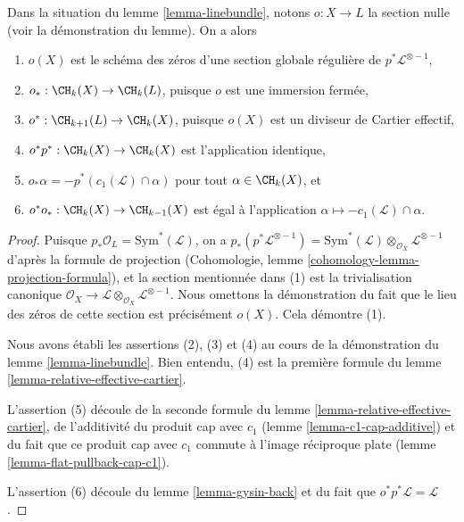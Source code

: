 \begin{lemma}
\label{lemma-linebundle-formulae}
Dans la situation du lemme \ref{lemma-linebundle}, notons $o : X \to L$
la section nulle (voir la démonstration du lemme). On a alors
\begin{enumerate}
\item $o(X)$ est le schéma des zéros d'une section globale régulière de
$p^*\mathcal{L}^{\otimes -1}$,
\item $o_* : \CH_k(X) \to \CH_k(L)$, puisque $o$ est une immersion fermée,
\item $o^* : \CH_{k + 1}(L) \to \CH_k(X)$, puisque $o(X)$
est un diviseur de Cartier effectif,
\item $o^* p^* : \CH_k(X) \to \CH_k(X)$ est l'application identique,
\item $o_*\alpha = - p^*(c_1(\mathcal{L}) \cap \alpha)$ pour tout
$\alpha \in \CH_k(X)$, et
\item $o^* o_* : \CH_k(X) \to \CH_{k - 1}(X)$ est égal à l'application
$\alpha \mapsto - c_1(\mathcal{L}) \cap \alpha$.
\end{enumerate}
\end{lemma}

\begin{proof}
Puisque $p_*\mathcal{O}_L = \text{Sym}^*(\mathcal{L})$, on a
$p_*(p^*\mathcal{L}^{\otimes -1}) =
\text{Sym}^*(\mathcal{L}) \otimes_{\mathcal{O}_X} \mathcal{L}^{\otimes -1}$
d'après la formule de projection
(Cohomologie, lemme \ref{cohomology-lemma-projection-formula}),
et la section mentionnée dans (1) est
la trivialisation canonique $\mathcal{O}_X \to
\mathcal{L} \otimes_{\mathcal{O}_X} \mathcal{L}^{\otimes -1}$.
Nous omettons la démonstration du fait que le lieu des zéros de
cette section est précisément $o(X)$. Cela démontre (1).

\medskip\noindent
Nous avons établi les assertions (2), (3) et (4) au cours de la démonstration du
lemme \ref{lemma-linebundle}. Bien entendu, (4) est la première
formule du lemme \ref{lemma-relative-effective-cartier}.

\medskip\noindent
L'assertion (5) découle de la seconde formule du
lemme \ref{lemma-relative-effective-cartier},
de l'additivité du produit cap avec $c_1$ (lemme \ref{lemma-c1-cap-additive})
et du fait que ce produit cap avec $c_1$ commute à l'image réciproque plate
(lemme \ref{lemma-flat-pullback-cap-c1}).

\medskip\noindent
L'assertion (6) découle du lemme \ref{lemma-gysin-back}
et du fait que $o^*p^*\mathcal{L} = \mathcal{L}$.
\end{proof}

